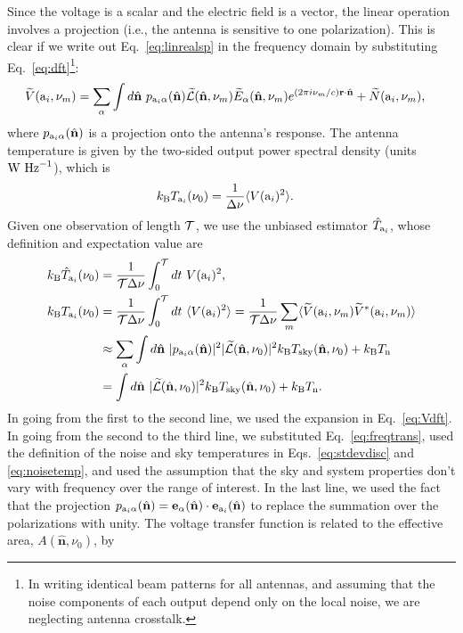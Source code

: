 \documentclass[11pt]{article}
\numberwithin{equation}{section}
\newcommand{\bt}[1]{\mathbf{#1}}
\newcommand{\wt}[1]{\widetilde{#1}}
\newcommand{\kb}{k_{\rm B}}
\begin{document}
Since the voltage is a scalar and the electric field is a vector, the linear operation involves a projection (i.e., the antenna is sensitive to one polarization). This is clear if we write out Eq.~\eqref{eq:linrealsp} in the frequency domain by substituting Eq.~\eqref{eq:dft}\footnote{In writing identical beam patterns for all antennas, and assuming that the noise components of each output depend only on the local noise, we are neglecting antenna crosstalk.}:
\begin{align}
  \wt{V}({\rm a}_i, \nu_m) & = \sum_\alpha \int d\hat{\bt n} \ p_{{\rm a}_i \alpha}(\hat{\bt n}) \wt{\mathcal{L}}(\hat{\bt n}, \nu_m)  \wt{E}_\alpha(\hat{\bt n}, \nu_m) e^{ (2\pi i \nu_m/c) {\bt r} \cdot \hat{\bt n}} + \wt{N}({\rm a}_i, \nu_m) \mbox{,} \label{eq:freqtrans}
\end{align}
where $p_{{\rm a}_i \alpha}(\hat{\bt n})$ is a projection onto the antenna's response. The antenna temperature is given by the two-sided output power spectral density (units ${\rm W} \ {\rm Hz}^{-1}$), which is 
\begin{align}
  \kb T_{{\rm a} _i}(\nu_0) & = \frac{1}{\Delta \nu} \langle V({\rm a}_i)^2 \rangle \mbox{.} \label{eq:anttemp}
\end{align}
Given one observation of length $\cal T$, we use the unbiased estimator $\hat{T}_{{\rm a}_i}$, whose definition and expectation value are
\begin{align}
  \kb \hat{T}_{{\rm a}_i}(\nu_0) & = \frac{1}{{\cal T} \Delta \nu} \int_0^{\cal T} dt \ V({\rm a}_i)^2 \mbox{,} \\
  \kb T_{{\rm a}_i}(\nu_0)
  & = \frac{1}{{\cal T} \Delta \nu} \int_0^{\cal T} dt \ \langle V({\rm a}_i)^2 \rangle
  = \frac{1}{\mathcal{T}\Delta{\nu}} \sum_{m} \langle \wt{V}({\rm a}_i, \nu_m) \wt{V}^\ast({\rm a}_i, \nu_m) \rangle \notag \\
  & \approx \sum_{\alpha} \int d\hat{\bt n} \ \vert p_{{\rm a}_i \alpha}(\hat{\bt n}) \vert^2 \vert \wt{\mathcal{L}}(\hat{\bt n}, \nu_0) \vert^2 \kb T_{\rm sky}(\hat{\bt n}, \nu_0) + \kb T_{\rm n} \notag \\
  & = \int d\hat{\bt n} \ \vert \wt{\mathcal{L}}(\hat{\bt n}, \nu_0) \vert^2 \kb T_{\rm sky}(\hat{\bt n}, \nu_0) + \kb T_{\rm n} \mbox{.} \label{eq:antresponse1}
\end{align}
In going from the first to the second line, we used the expansion in Eq.~\eqref{eq:Vdft}. In going from the second to the third line, we substituted Eq.~\eqref{eq:freqtrans}, used the definition of the noise and sky temperatures in Eqs.~\eqref{eq:stdevdisc} and \eqref{eq:noisetemp}, and used the assumption that the sky and system properties don't vary with frequency over the range of interest. In the last line, we used the fact that the projection $p_{{\rm a}_i \alpha}(\hat{\bt n}) = {\bt e}_\alpha(\hat{\bt n}) \cdot {\bt e}_{{\rm a}_i}(\hat{\bt n})$ to replace the summation over the polarizations with unity. The voltage transfer function is related to the effective area, $A(\hat{\bt n}, \nu_0)$, by
\end{document}
